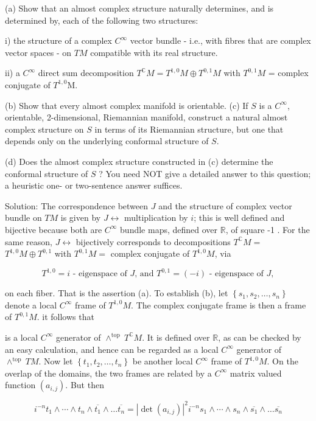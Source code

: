 \documentclass[10pt]{article}
\begin{document}
(a) Show that an almost complex structure naturally determines, and is determined by, each of the following two structures:

i) the structure of a complex $C^{\infty}$ vector bundle - i.e., with fibres that are complex vector spaces - on $T M$ compatible with its real structure.

ii) a $C^{\infty}$ direct sum decomposition $T^{\mathbb{C}} M=T^{1,0} M \oplus T^{0,1} M$ with $T^{0,1} M$ = complex conjugate of $T^{1,0} \mathrm{M}$.

(b) Show that every almost complex manifold is orientable.
(c) If $S$ is a $C^{\infty}$, orientable, 2-dimensional, Riemannian manifold, construct a natural almost complex structure on $S$ in terms of its Riemannian structure, but one that depends only on the underlying conformal structure of $S$.

(d) Does the almost complex structure constructed in (c) determine the conformal structure of $S$ ? You need NOT give a detailed answer to this question; a heuristic one- or two-sentence answer suffices.

Solution: The correspondence between $J$ and the structure of complex vector bundle on $T M$ is given by $J \leftrightarrow$ multiplication by $i$; this is well defined and bijective because both are $C^{\infty}$ bundle maps, defined over $\mathbb{R}$, of square -1 . For the same reason, $J \leftrightarrow$ bijectively corresponds to decompositions $T^{\mathbb{C}} M=$ $T^{1,0} M \oplus T^{0,1}$ with $T^{0,1} M=$ complex conjugate of $T^{1,0} M$, via

$$
T^{1,0}=i \text { - eigenspace of } J \text {, and } T^{0,1}=(-i) \text { - eigenspace of } J,
$$

on each fiber. That is the assertion (a). To establish (b), let $\left\{s_{1}, s_{2}, \ldots, s_{n}\right\}$ denote a local $C^{\infty}$ frame of $T^{1,0} M$. The complex conjugate frame is then a frame of $T^{0,1} M$. it follows that

is a local $C^{\infty}$ generator of $\wedge^{\text {top }} T^{\mathbb{C}} M$. It is defined over $\mathbb{R}$, as can be checked by an easy calculation, and hence can be regarded as a local $C^{\infty}$ generator of $\wedge^{\text {top }} T M$. Now let $\left\{t_{1}, t_{2}, \ldots, t_{n}\right\}$ be another local $C^{\infty}$ frame of $T^{1,0} M$. On the overlap of the domains, the two frames are related by a $C^{\infty}$ matrix valued function $\left(a_{i, j}\right)$. But then

$$
i^{-n} t_{1} \wedge \cdots \wedge t_{n} \wedge \overline{t_{1}} \wedge \ldots \overline{t_{n}}=\left|\operatorname{det}\left(a_{i, j}\right)\right|^{2} i^{-n} s_{1} \wedge \cdots \wedge s_{n} \wedge \overline{s_{1}} \wedge \ldots \overline{s_{n}}
$$
\end{document}
